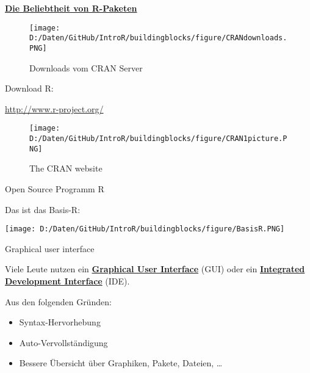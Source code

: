 \documentclass[ignorenonframetext,]{beamer}
\providecommand{\tightlist}{%
  \setlength{\itemsep}{0pt}\setlength{\parskip}{0pt}}
\begin{document}
\begin{frame}{\href{https://gallery.shinyapps.io/cran-gauge/}{\textbf{Die
Beliebtheit von R-Paketen}}}
\protect\hypertarget{die-beliebtheit-von-r-paketen}{}

\begin{figure}
\centering
\texttt{[image: D:/Daten/GitHub/IntroR/buildingblocks/figure/CRANdownloads.PNG]}
\caption{Downloads vom CRAN Server}
\end{figure}

\end{frame}

\begin{frame}{Download R:}
\protect\hypertarget{download-r}{}

\url{http://www.r-project.org/}

\begin{figure}
\centering
\texttt{[image: D:/Daten/GitHub/IntroR/buildingblocks/figure/CRAN1picture.PNG]}
\caption{The CRAN website}
\end{figure}

\end{frame}

\begin{frame}{Open Source Programm R}
\protect\hypertarget{open-source-programm-r}{}

\begin{block}{Das ist das Basis-R:}

\texttt{[image: D:/Daten/GitHub/IntroR/buildingblocks/figure/BasisR.PNG]}

\end{block}

\end{frame}

\begin{frame}{Graphical user interface}
\protect\hypertarget{graphical-user-interface}{}

Viele Leute nutzen ein
\href{https://en.wikipedia.org/wiki/Graphical_user_interface}{\textbf{Graphical
User Interface}} (GUI) oder ein
\href{https://en.wikipedia.org/wiki/Integrated_development_environment}{\textbf{Integrated
Development Interface}} (IDE).

Aus den folgenden Gründen:

\begin{itemize}
\tightlist
\item
  Syntax-Hervorhebung
\item
  Auto-Vervollständigung
\item
  Bessere Übersicht über Graphiken, Pakete, Dateien, \ldots{}
\end{itemize}

\end{frame}
\end{document}
